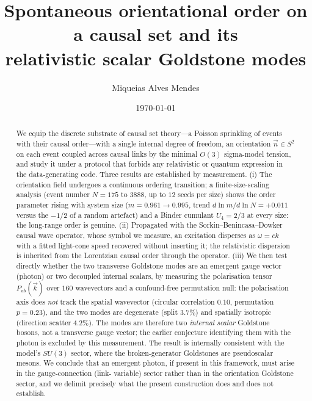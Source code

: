 \documentclass[aps,prd,reprint,nofootinbib,superscriptaddress,floatfix]{revtex4-2}
\begin{document}
\title{Spontaneous orientational order on a causal set and its\\
relativistic scalar Goldstone modes}

\author{Miqueias Alves Mendes}
\date{\today}

\begin{abstract}
We equip the discrete substrate of causal set theory---a Poisson sprinkling of
events with their causal order---with a single internal degree of freedom, an
orientation $\vec n\in S^2$ on each event coupled across causal links by the minimal
$O(3)$ sigma-model tension, and study it under a protocol that forbids any
relativistic or quantum expression in the data-generating code. Three results are
established by measurement. (i) The orientation field undergoes a continuous
ordering transition; a finite-size-scaling analysis (event number $N=175$ to $3888$,
up to $12$ seeds per size) shows the order parameter rising with system size
($m=0.961\to0.995$, trend $d\ln m/d\ln N=+0.011$ versus the $-1/2$ of a random
artefact) and a Binder cumulant $U_4=2/3$ at every size: the long-range order is
genuine. (ii) Propagated with the Sorkin--Benincasa--Dowker causal wave operator,
whose symbol we measure, an excitation disperses as $\omega=ck$ with a fitted
light-cone speed recovered without inserting it; the relativistic dispersion is
inherited from the Lorentzian causal order through the operator. (iii) We then test
directly whether the two transverse Goldstone modes are an emergent gauge vector
(photon) or two decoupled internal scalars, by measuring the polarisation tensor
$P_{ab}(\vec k)$ over $160$ wavevectors and a confound-free permutation null: the
polarisation axis does \emph{not} track the spatial wavevector (circular correlation
$0.10$, permutation $p=0.23$), and the two modes are degenerate (split $3.7\%$) and
spatially isotropic (direction scatter $4.2\%$). The modes are therefore two
\emph{internal scalar} Goldstone bosons, not a transverse gauge vector; the earlier
conjecture identifying them with the photon is excluded by this measurement. The
result is internally consistent with the model's $SU(3)$ sector, where the
broken-generator Goldstones are pseudoscalar mesons. We conclude that an emergent
photon, if present in this framework, must arise in the gauge-connection (link-
variable) sector rather than in the orientation Goldstone sector, and we delimit
precisely what the present construction does and does not establish.
\end{abstract}
\end{document}
